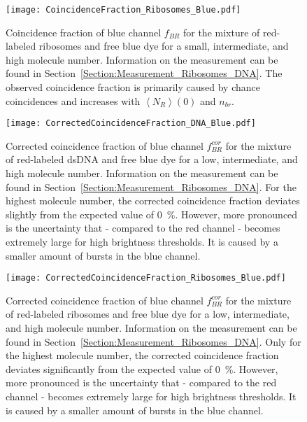 \vfill
\begin{figure}[h]
	\centering
	\texttt{[image: CoincidenceFraction\_Ribosomes\_Blue.pdf]}
	\caption[Coincidence fraction of blue channel for mixture of red-labeled ribosomes and free blue dye]{Coincidence fraction of blue channel $f_{BR}$ for the mixture of red-labeled ribosomes and free blue dye for a small, intermediate, and high molecule number. Information on the measurement can be found in Section~\ref{Section:Measurement_Ribosomes_DNA}. The observed coincidence fraction is primarily caused by chance coincidences and increases with $\left\langle N_R \right\rangle (0)$ and $n_{br}$.}
	\label{fig:CoincidenceFraction_Ribosomes_Blue}
\end{figure}
\vfill

\vfill
\begin{figure}[h]
	\centering
	\texttt{[image: CorrectedCoincidenceFraction\_DNA\_Blue.pdf]}
	\caption[Corrected coincidence fraction of blue channel for mixture of red-labeled \gls{dsDNA} and free blue dye]{Corrected coincidence fraction of blue channel $f_{BR}^{cor}$ for the mixture of red-labeled \gls{dsDNA} and free blue dye for a low, intermediate, and high molecule number. Information on the measurement can be found in Section~\ref{Section:Measurement_Ribosomes_DNA}. For the highest molecule number, the corrected coincidence fraction deviates slightly from the expected value of \SI{0}{\percent}. However, more pronounced is the uncertainty that - compared to the red channel - becomes extremely large for high brightness thresholds. It is caused by a smaller amount of bursts in the blue channel.}
	\label{fig:CorrectedCoincidenceFraction_DNA_Blue}
\end{figure}
\vfill

\vfill
\begin{figure}[h]
	\centering
	\texttt{[image: CorrectedCoincidenceFraction\_Ribosomes\_Blue.pdf]}
	\caption[Corrected coincidence fraction of blue channel for mixture of red-labeled ribosomes and free blue dye]{Corrected coincidence fraction of blue channel $f_{BR}^{cor}$ for the mixture of red-labeled ribosomes and free blue dye for a low, intermediate, and high molecule number. Information on the measurement can be found in Section~\ref{Section:Measurement_Ribosomes_DNA}. Only for the highest molecule number, the corrected coincidence fraction deviates significantly from the expected value of \SI{0}{\percent}. However, more pronounced is the uncertainty that - compared to the red channel - becomes extremely large for high brightness thresholds. It is caused by a smaller amount of bursts in the blue channel.}
	\label{fig:CorrectedCoincidenceFraction_Ribosomes_Blue}
\end{figure}
\vfill

